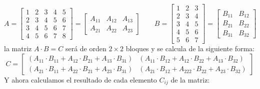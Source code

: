 \[
A = \left[\begin{array}{c|cc|cc}
1 & 2 & 3 & 4 & 5 \\
2 & 3 & 4 & 5 & 6 \\
3 & 4 & 5 & 6 & 7 \\
\hline
4 & 5 & 6 & 7 & 8  
\end{array}\right] = \begin{bmatrix}
  A_{11} & A_{12} & A_{13}\\
  A_{21} & A_{22} & A_{23}
\end{bmatrix}\qquad B = \left[\begin{array}{c|cc}
1 & 2 & 3 \\
\hline
2 & 3 & 4 \\
3 & 4 & 5 \\
\hline
4 & 5 & 6 \\
5 & 6 & 7
\end{array}\right] = \begin{bmatrix}
  B_{11} & B_{12} \\
  B_{21} & B_{22} \\
  B_{31} & B_{32}
\end{bmatrix}
\]
la matriz \(A \cdot B = C\) será de orden \(2 \times 2\) bloques y se calcula de la siguiente forma:
\[
C = \begin{bmatrix}
  \left(A_{11} \cdot B_{11} + A_{12} \cdot B_{21} + A_{13} \cdot B_{31}\right) & \left(A_{11} \cdot B_{12} + A_{12} \cdot B_{22} + A_{13} \cdot B_{32}\right)\\
  \left(A_{21} \cdot B_{11} + A_{22} \cdot B_{21} + A_{23} \cdot B_{31}\right) & \left(A_{21} \cdot B_{12} + A_{222} \cdot B_{22} + A_{23} \cdot B_{32}\right)
\end{bmatrix}
\]
Y ahora calculamos el resultado de cada elemento \(C_{ij}\) de la matriz:
